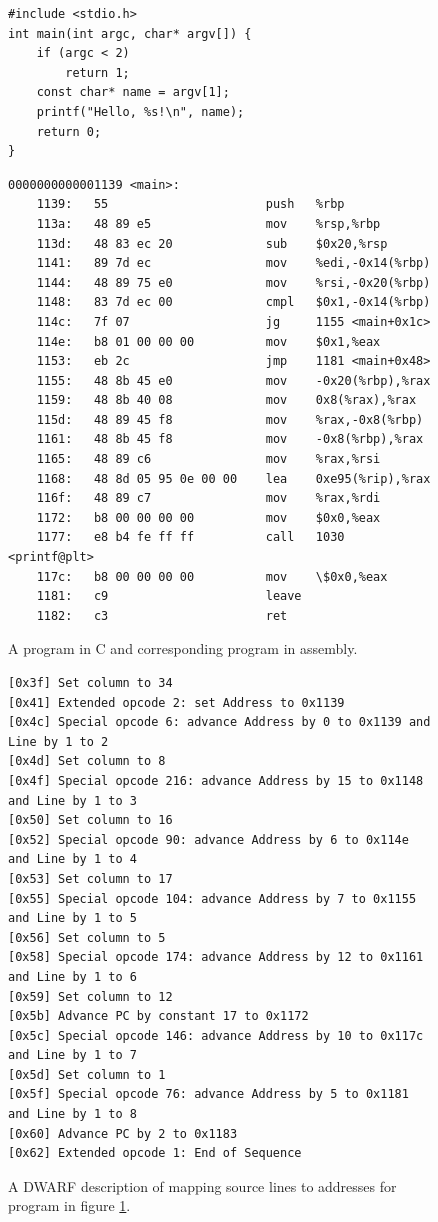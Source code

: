 \begin{figure}
    \begin{verbatim}
#include <stdio.h>
int main(int argc, char* argv[]) {
    if (argc < 2)
        return 1;
    const char* name = argv[1];
    printf("Hello, %s!\n", name);
    return 0;
}
    \end{verbatim}
    \begin{lstlisting}
0000000000001139 <main>:
    1139:	55                   	push   %rbp
    113a:	48 89 e5             	mov    %rsp,%rbp
    113d:	48 83 ec 20          	sub    $0x20,%rsp
    1141:	89 7d ec             	mov    %edi,-0x14(%rbp)
    1144:	48 89 75 e0          	mov    %rsi,-0x20(%rbp)
    1148:	83 7d ec 00          	cmpl   $0x1,-0x14(%rbp)
    114c:	7f 07                	jg     1155 <main+0x1c>
    114e:	b8 01 00 00 00       	mov    $0x1,%eax
    1153:	eb 2c                	jmp    1181 <main+0x48>
    1155:	48 8b 45 e0          	mov    -0x20(%rbp),%rax
    1159:	48 8b 40 08          	mov    0x8(%rax),%rax
    115d:	48 89 45 f8          	mov    %rax,-0x8(%rbp)
    1161:	48 8b 45 f8          	mov    -0x8(%rbp),%rax
    1165:	48 89 c6             	mov    %rax,%rsi
    1168:	48 8d 05 95 0e 00 00 	lea    0xe95(%rip),%rax
    116f:	48 89 c7             	mov    %rax,%rdi
    1172:	b8 00 00 00 00       	mov    $0x0,%eax
    1177:	e8 b4 fe ff ff       	call   1030 <printf@plt>
    117c:	b8 00 00 00 00       	mov    \$0x0,%eax
    1181:	c9                   	leave
    1182:	c3                   	ret
    \end{lstlisting}
    \caption{A program in C and corresponding program in assembly.}
    \label{fig:c-program-and-its-assembly}
\end{figure}

\begin{figure}
    \begin{lstlisting}
[0x3f] Set column to 34
[0x41] Extended opcode 2: set Address to 0x1139
[0x4c] Special opcode 6: advance Address by 0 to 0x1139 and Line by 1 to 2
[0x4d] Set column to 8
[0x4f] Special opcode 216: advance Address by 15 to 0x1148 and Line by 1 to 3
[0x50] Set column to 16
[0x52] Special opcode 90: advance Address by 6 to 0x114e and Line by 1 to 4
[0x53] Set column to 17
[0x55] Special opcode 104: advance Address by 7 to 0x1155 and Line by 1 to 5
[0x56] Set column to 5
[0x58] Special opcode 174: advance Address by 12 to 0x1161 and Line by 1 to 6
[0x59] Set column to 12
[0x5b] Advance PC by constant 17 to 0x1172
[0x5c] Special opcode 146: advance Address by 10 to 0x117c and Line by 1 to 7
[0x5d] Set column to 1
[0x5f] Special opcode 76: advance Address by 5 to 0x1181 and Line by 1 to 8
[0x60] Advance PC by 2 to 0x1183
[0x62] Extended opcode 1: End of Sequence
    \end{lstlisting}
    \caption{A DWARF description of mapping source lines to addresses for
    program in figure \ref{fig:c-program-and-its-assembly}.}
    \label{fig:dwarf-locations}
\end{figure}

